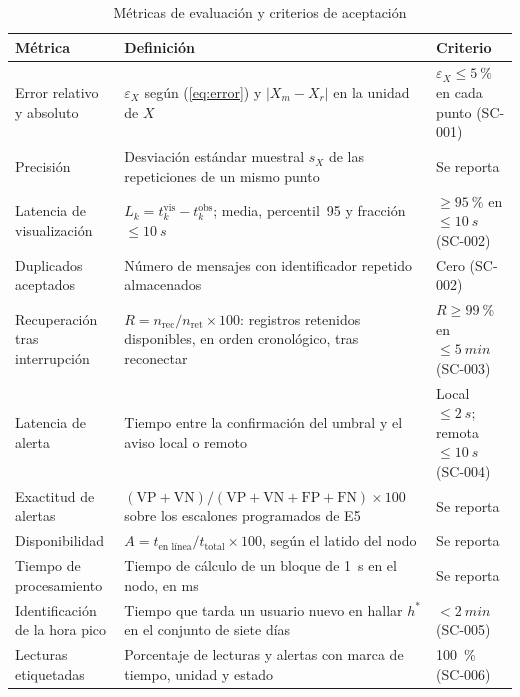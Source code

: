 \begin{table}[t]
\centering
\caption{Métricas de evaluación y criterios de aceptación}
\label{tab:metrics}
\footnotesize
\begin{tabular}{@{}p{3.8cm} p{8.2cm} p{4.6cm}@{}}
\toprule
Métrica & Definición & Criterio \\
\midrule
Error relativo y absoluto & $\varepsilon_X$ según (\ref{eq:error}) y $|X_m-X_r|$ en la unidad de $X$ & $\varepsilon_X\leq\SI{5}{\percent}$ en cada punto (SC-001) \\
Precisión & Desviación estándar muestral $s_X$ de las repeticiones de un mismo punto & Se reporta \\
Latencia de visualización & $L_k=t_k^{\mathrm{vis}}-t_k^{\mathrm{obs}}$; media, percentil~95 y fracción $\leq\SI{10}{s}$ & $\geq\SI{95}{\percent}$ en $\leq\SI{10}{s}$ (SC-002) \\
Duplicados aceptados & Número de mensajes con identificador repetido almacenados & Cero (SC-002) \\
Recuperación tras interrupción & $R=n_{\mathrm{rec}}/n_{\mathrm{ret}}\times100$: registros retenidos disponibles, en orden cronológico, tras reconectar & $R\geq\SI{99}{\percent}$ en $\leq\SI{5}{min}$ (SC-003) \\
Latencia de alerta & Tiempo entre la confirmación del umbral y el aviso local o remoto & Local $\leq\SI{2}{s}$; remota $\leq\SI{10}{s}$ (SC-004) \\
Exactitud de alertas & $(\mathrm{VP}+\mathrm{VN})/(\mathrm{VP}+\mathrm{VN}+\mathrm{FP}+\mathrm{FN})\times100$ sobre los escalones programados de E5 & Se reporta \\
Disponibilidad & $A=t_{\text{en línea}}/t_{\text{total}}\times100$, según el latido del nodo & Se reporta \\
Tiempo de procesamiento & Tiempo de cálculo de un bloque de \SI{1}{s} en el nodo, en ms & Se reporta \\
Identificación de la hora pico & Tiempo que tarda un usuario nuevo en hallar $h^{*}$ en el conjunto de siete días & $<\SI{2}{min}$ (SC-005) \\
Lecturas etiquetadas & Porcentaje de lecturas y alertas con marca de tiempo, unidad y estado & \SI{100}{\percent} (SC-006) \\
\bottomrule
\end{tabular}
\end{table}
